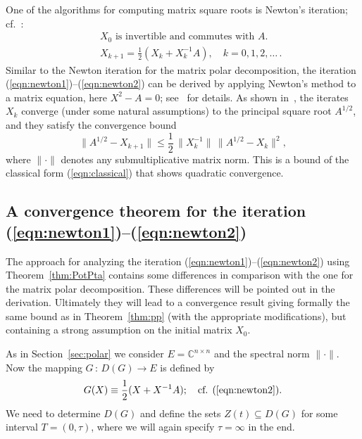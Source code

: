 \documentclass{siamltex}
\begin{document}
One of the algorithms for computing matrix square roots is Newton's
iteration; cf.~\cite[Equation (6.12)]{HigBook08}:
\begin{eqnarray}
& & \mbox{$X_0$ is invertible and commutes with $A$.}\label{eqn:newton1}\\
& & X_{k+1} = \frac12 (X_k+X_k^{-1}A),\quad k=0,1,2,\dots\,.\label{eqn:newton2}
\end{eqnarray}
Similar to the Newton iteration for the matrix polar decomposition, the iteration
(\ref{eqn:newton1})--(\ref{eqn:newton2}) can be derived by applying Newton's method
to a matrix equation, here $X^2-A=0$; see~\cite[pp.~139--140]{HigBook08} for details.
As shown in~\cite[Theorem~6.9]{HigBook08}, the iterates $X_k$ converge (under some
natural assumptions) to the principal square root $A^{1/2}$, and they satisfy the
convergence bound
$$\|A^{1/2}-X_{k+1}\|\leq \frac12\,\|X_k^{-1}\|\,\|A^{1/2}-X_k\|^2,$$
where $\|\cdot\|$ denotes any submultiplicative matrix norm.
This is a bound of the classical form (\ref{eqn:classical}) that
shows quadratic convergence.

\subsection{A convergence theorem for the iteration (\ref{eqn:newton1})--(\ref{eqn:newton2})}

The approach for analyzing the iteration (\ref{eqn:newton1})--(\ref{eqn:newton2})
using Theorem~\ref{thm:PotPta} contains some differences in comparison with the one
for the matrix polar decomposition. These differences will be pointed out in the
derivation. Ultimately they will lead to a convergence result giving formally the
same bound as in Theorem~\ref{thm:pp} (with the appropriate modifications), but
containing a strong assumption on the initial matrix $X_0$.

As in Section~\ref{sec:polar} we consider $E={\mathbb C}^{n\times n}$ and
the spectral norm $\|\cdot\|$. Now the mapping $G\,:\,D(G)\rightarrow E$ is defined by
$$G(X)\equiv\frac12 (X+X^{-1}A);\quad\mbox{cf. (\ref{eqn:newton2}).}$$
We need to determine $D(G)$ and define the sets $Z(t)\subseteq D(G)$ for some interval
$T=(0,\tau)$, where we will again specify $\tau=\infty$ in the end.
\end{document}
